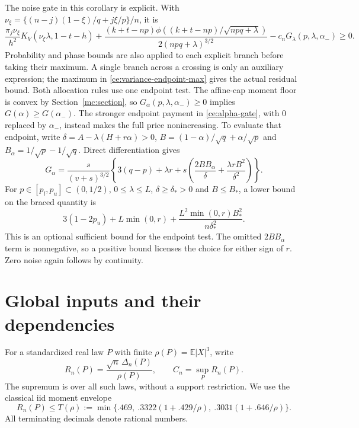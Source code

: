 \documentclass[aop,preprint]{imsart}
\theoremstyle{definition}
\newcommand{\E}{\mathbb E}
\numberwithin{equation}{section}
\begin{document}
The noise gate in this corollary is explicit. With
$\nu_\xi=\{(n-j)(1-\xi)/q+j\xi/p\}/n$, it is
\[
 \frac{\pi_j\nu_\xi}{h^2}K_V(\nu_\xi\lambda,1-t-h)
 +\frac{(k+t-np)\phi((k+t-np)/\sqrt{npq+\lambda})}
               {2(npq+\lambda)^{3/2}}
 -c_nG_\lambda(p,\lambda,\alpha_-)\ge0.
\]
Probability and phase bounds are also applied to each explicit branch
before taking their maximum. A single branch across a crossing is
only an auxiliary expression; the maximum in
\eqref{ce:variance-endpoint-max} gives the actual residual bound.
Both allocation rules use one endpoint test. The affine-cap moment
floor is convex by Section~\ref{mc:section}, so
$G_\alpha(p,\lambda,\alpha_-)\ge0$ implies $G(\alpha)\ge G(\alpha_-)$.
The stronger endpoint payment in \eqref{ce:alpha-gate}, with $0$
replaced by $\alpha_-$, instead makes the full price nonincreasing.
To evaluate that endpoint, write $\delta=A-\lambda(H+r\alpha)>0$,
$B=(1-\alpha)/\sqrt q+\alpha/\sqrt p$ and
$B_\alpha=1/\sqrt p-1/\sqrt q$. Direct differentiation gives
\begin{equation}\label{ce:signed-allocation-derivative}
 G_\alpha=\frac{s}{(v+s)^{3/2}}
 \left\{3(q-p)+\lambda r+s\left(
 \frac{2BB_\alpha}{\delta}+\frac{\lambda rB^2}{\delta^2}\right)\right\}.
\end{equation}
For $p\in[p_l,p_u]\subset(0,1/2)$, $0\le\lambda\le L$,
$\delta\ge\delta_*>0$ and $B\le B_*$, a lower bound on the
braced quantity is
\begin{equation}\label{ce:signed-allocation-gate}
 3(1-2p_u)+L\min(0,r)
       +\frac{L^2\min(0,r)B_*^2}{n\delta_*^2}.
\end{equation}
This is an optional sufficient bound for the endpoint test.
The omitted $2BB_\alpha$ term is nonnegative, so a positive bound
licenses the choice for either sign of $r$.
Zero noise again follows by continuity.

\section{Global inputs and their dependencies}\label{gi:section}

For a standardized real law $P$ with finite $\rho(P)=\E|X|^3$, write
\[
 R_n(P)=\frac{\sqrt n\,\Delta_n(P)}{\rho(P)},\qquad
 C_n=\sup_P R_n(P).
\]
The supremum is over all such laws, without a support restriction.
We use the classical iid moment envelope \cite{Shevtsova2013}
\begin{equation}\label{gi:moment-envelope}
 R_n(P)\le T(\rho):=
 \min\{.469,\ .3322(1+.429/\rho),\ .3031(1+.646/\rho)\}.
\end{equation}
All terminating decimals denote rational numbers.
\end{document}

